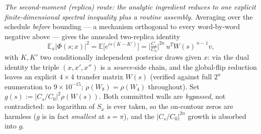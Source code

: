 \documentclass[
]{article}
\begin{document}
\emph{The second-moment (replica) route: the analytic ingredient reduces to one explicit
finite-dimensional spectral inequality plus a routine assembly.} Averaging over the schedule
\emph{before} bounding --- a mechanism orthogonal to every word-by-word negative above --- gives the
annealed two-replica identity
\[
  \mathbb E_x\big|\Phi(s;x)\big|^2=\mathbb E\big[e^{is(K-K')}\big]
  =\Big|\tfrac{C_s}{C_0}\Big|^{2n}\,u^{T}W(s)^{\,n-1}v,
\]
with $K,K'$ two conditionally independent posterior draws given $x$: via the dual identity the triple
$(x,x',x'')$ is a \emph{source}-side chain, and the global-flip reduction leaves an explicit $4\times4$
transfer matrix $W(s)$ (verified against full $2^n$ enumeration to $9\times10^{-15}$;
$\rho(W_8)=\rho(W_4)$ throughout). Set $g(s):=|C_s/C_0|^2\rho(W(s))$. Both
committed walls are \emph{bypassed}, not contradicted: no logarithm of $S_x$ is ever taken, so the
on-contour zeros are harmless ($g$ is in fact \emph{smallest} at $s=\pi$), and the
$|C_s/C_0|^{2n}$ growth is absorbed into $g$.
\end{document}
